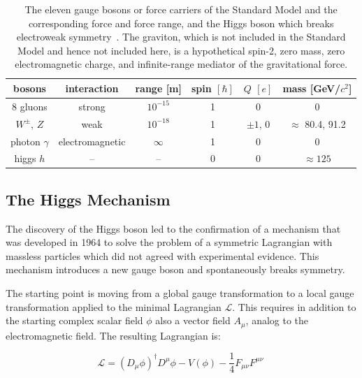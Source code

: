 \begin{table}
	\centering
	\begin{tabular}{| c || c | c | c | c | c |}
		\hline
		bosons & interaction & range [m] & spin $[\hbar]$ & $Q$ $[e]$ & mass [GeV/$c^2$]\\\hline\hline
		8 gluons &  strong  & $10^{-15}$ & 1 & 0 & 0 \\\hline
		$W^\pm$, $Z$ & weak  & $ 10^{-18}$ & 1 & $\pm 1$, 0 & $\approx$ 80.4, 91.2 \\\hline
		photon $\gamma$ &  electromagnetic  & $\infty$ & 1 & 0 & 0 \\\hline\hline
		higgs $h$ &  --  &  -- & 0 & 0 & $\approx 125$ \\\hline
		
	\end{tabular}
	\caption{
		The eleven gauge bosons or force carriers of the Standard Model and the corresponding force and force range, and the Higgs boson which breaks electroweak symmetry~\cite{pdg12}.
		The graviton, which is not included in the Standard Model and hence not included here, is a hypothetical spin-2, zero mass, zero electromagnetic charge, and infinite-range mediator of the gravitational force.
	}
	\label{table::bosons}
\end{table}

\subsection{The Higgs Mechanism}
\label{higgs_mechanism}

The discovery of the Higgs boson led to the confirmation of a mechanism that was developed in 1964 to solve the problem of a symmetric Lagrangian with massless particles which did not agreed with experimental evidence. This mechanism introduces a new gauge boson and spontaneously breaks symmetry.

The starting point is moving from a global gauge transformation to a local gauge transformation applied to the minimal Lagrangian $\mathcal{L}$. This requires in addition to the starting complex scalar field $\phi$ also a vector field $A_{\mu}$, analog to the electromagnetic field. The resulting Lagrangian is:

\begin{equation}
\mathcal{L} = (D_{\mu}\phi)^{\dagger} D^{\mu}\phi - V (\phi) - \dfrac{1}{4}F_{\mu\nu}F^{\mu\nu}\
\label{eq::lagrangian_min}
\end{equation}

